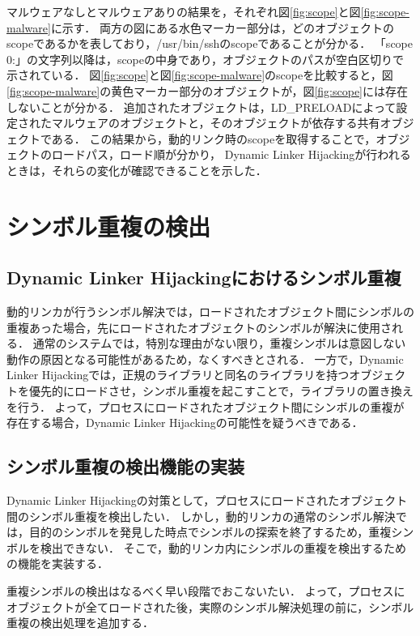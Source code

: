 \documentclass[submit,techreq,noauthor]{eco}	%
\begin{document}
マルウェアなしとマルウェアありの結果を，それぞれ図\ref{fig:scope}と図\ref{fig:scope-malware}に示す．
両方の図にある水色マーカー部分は，どのオブジェクトのscopeであるかを表しており，/usr/bin/sshのscopeであることが分かる．
「scope 0:」の文字列以降は，scopeの中身であり，オブジェクトのパスが空白区切りで示されている．
図\ref{fig:scope}と図\ref{fig:scope-malware}のscopeを比較すると，図\ref{fig:scope-malware}の黄色マーカー部分のオブジェクトが，図\ref{fig:scope}には存在しないことが分かる．
追加されたオブジェクトは，LD\_PRELOADによって設定されたマルウェアのオブジェクトと，そのオブジェクトが依存する共有オブジェクトである．
この結果から，動的リンク時のscopeを取得することで，オブジェクトのロードパス，ロード順が分かり，
Dynamic Linker Hijackingが行われるときは，それらの変化が確認できることを示した．\\

\section{シンボル重複の検出}
\subsection{Dynamic Linker Hijackingにおけるシンボル重複}
動的リンカが行うシンボル解決では，ロードされたオブジェクト間にシンボルの重複あった場合，先にロードされたオブジェクトのシンボルが解決に使用される．
通常のシステムでは，特別な理由がない限り，重複シンボルは意図しない動作の原因となる可能性があるため，なくすべきとされる．
一方で，Dynamic Linker Hijackingでは，正規のライブラリと同名のライブラリを持つオブジェクトを優先的にロードさせ，シンボル重複を起こすことで，ライブラリの置き換えを行う．
よって，プロセスにロードされたオブジェクト間にシンボルの重複が存在する場合，Dynamic Linker Hijackingの可能性を疑うべきである．

\subsection{シンボル重複の検出機能の実装}
Dynamic Linker Hijackingの対策として，プロセスにロードされたオブジェクト間のシンボル重複を検出したい．
しかし，動的リンカの通常のシンボル解決では，目的のシンボルを発見した時点でシンボルの探索を終了するため，重複シンボルを検出できない．
そこで，動的リンカ内にシンボルの重複を検出するための機能を実装する．

重複シンボルの検出はなるべく早い段階でおこないたい．
よって，プロセスにオブジェクトが全てロードされた後，実際のシンボル解決処理の前に，シンボル重複の検出処理を追加する．\\
\end{document}
